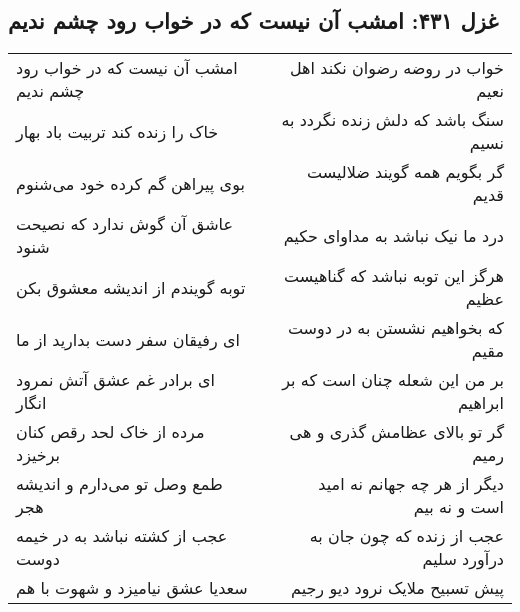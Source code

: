 \begin{center}
\section*{غزل ۴۳۱: امشب آن نیست که در خواب رود چشم ندیم}
\label{sec:431}
\begin{longtable}{l p{0.5cm} r}
امشب آن نیست که در خواب رود چشم ندیم
&&
خواب در روضه رضوان نکند اهل نعیم
\\
خاک را زنده کند تربیت باد بهار
&&
سنگ باشد که دلش زنده نگردد به نسیم
\\
بوی پیراهن گم کرده خود می‌شنوم
&&
گر بگویم همه گویند ضلالیست قدیم
\\
عاشق آن گوش ندارد که نصیحت شنود
&&
درد ما نیک نباشد به مداوای حکیم
\\
توبه گویندم از اندیشه معشوق بکن
&&
هرگز این توبه نباشد که گناهیست عظیم
\\
ای رفیقان سفر دست بدارید از ما
&&
که بخواهیم نشستن به در دوست مقیم
\\
ای برادر غم عشق آتش نمرود انگار
&&
بر من این شعله چنان است که بر ابراهیم
\\
مرده از خاک لحد رقص کنان برخیزد
&&
گر تو بالای عظامش گذری و هی رمیم
\\
طمع وصل تو می‌دارم و اندیشه هجر
&&
دیگر از هر چه جهانم نه امید است و نه بیم
\\
عجب از کشته نباشد به در خیمه دوست
&&
عجب از زنده که چون جان به درآورد سلیم
\\
سعدیا عشق نیامیزد و شهوت با هم
&&
پیش تسبیح ملایک نرود دیو رجیم
\\
\end{longtable}
\end{center}

